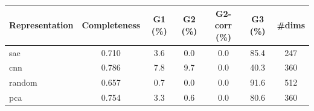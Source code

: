\begin{tabular}{lcccccc}
\toprule
Representation & Completeness & G1 (\%) & G2 (\%) & G2-corr (\%) & G3 (\%) & \#dims \\
\midrule
sae & 0.710 & 3.6 & 0.0 & 0.0 & 85.4 & 247 \\
cnn & 0.786 & 7.8 & 9.7 & 0.0 & 40.3 & 360 \\
random & 0.657 & 0.7 & 0.0 & 0.0 & 91.6 & 512 \\
pca & 0.754 & 3.3 & 0.6 & 0.0 & 80.6 & 360 \\
\bottomrule
\end{tabular}